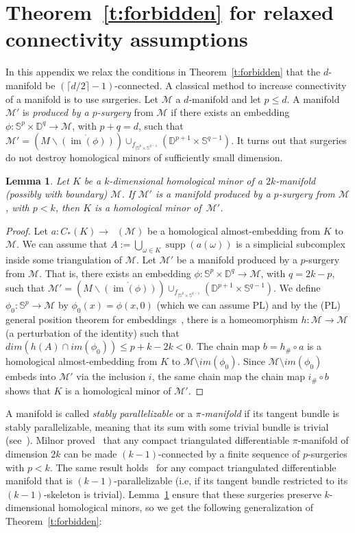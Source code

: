 \documentclass[11pt]{article}
\newcommand{\M}{\mathcal{M}}
\DeclareMathOperator{\supp}{supp}
\DeclareMathOperator{\Csing}{C_*^{sing}}
\DeclareMathOperator{\im}{im}
\newcommand{\defn}[1]{\emph{\color{violet}#1}}
\newcommand{\pth}[1]{\left(#1\right)}
\newtheorem{lemma}{Lemma}[section]
\begin{document}
\section{Theorem~\ref{t:forbidden} for relaxed connectivity assumptions}\label{app:relax}
%
In this appendix we relax the conditions in Theorem~\ref{t:forbidden} that the $d$-manifold be $(\lceil d/2 \rceil -1)$-connected. 
%
\medskip
%
A classical method to increase connectivity of a manifold is to use surgeries. Let $\M$ a $d$-manifold and let $p \le d$. A manifold~$\M'$ is \defn{produced by a $p$-surgery} from $\M$ if there exists an embedding $\phi:\mathbb{S}^p\times \mathbb{D}^{q}\to \M$, with $p+q=d$, such that $\M'= \pth{M\backslash \mathring{\pth{\im(\phi)}}}\cup_{f_{|\mathbb{S}^p\times\mathbb{S}^{q-1}}}\pth{\mathbb{D}^{p+1}\times\mathbb{S}^{q-1}}$. It turns out that surgeries do not destroy homological minors of sufficiently small dimension.
%
\begin{lemma}\label{l:surgery-stability-minors}
  Let $K$ be a $k$-dimensional homological minor of a $2k$-manifold (possibly with boundary) $\M$. If $\M'$ is a manifold produced by a $p$-surgery from $\M$,
  with $p < k$, then $K$ is a homological minor of~$\M'$.
\end{lemma}
\begin{proof}
  Let $a:C_*(K)\to \Csing(\M)$ be a homological almost-embedding from $K$ to $\M$. We can assume that $A:=\bigcup_{\omega\in K}\supp(a(\omega))$ is a simplicial subcomplex inside some triangulation of $\M$. Let $\M'$ be a manifold produced by a $p$-surgery from $\M$. That is, there exists an embedding $\phi:\mathbb{S}^p\times\mathbb{D}^q\to \M$, with  $q = 2k-p$, such that $\M'= \pth{M\backslash \mathring{\pth{\im(\phi)}}}\cup_{f_{|\mathbb{S}^p\times\mathbb{S}^{q-1}}}\pth{\mathbb{D}^{p+1}\times\mathbb{S}^{q-1}}$. We define $\phi_0:\mathbb{S}^p\to\M$ by $\phi_0(x)=\phi(x,0)$ (which we can assume PL) and by the (PL) general position theorem for embeddings~\cite[$\S$5.3]{Rourke1972IntroductionTP}, there is a homeomorphism $h:\M\to\M$ (a perturbation of the identity) such that $dim\pth{h( A)\cap im(\phi_0)}\leq p+k-2k<0$. The chain map $b=h_{\#}\circ a$ is a homological almost-embedding from $K$ to $\M\setminus im(\phi_0)$. Since $\M\setminus im(\phi_0)$ embeds into $\M'$ via the inclusion $i$, the same chain map the chain map $i_\#\circ b$ shows that $K$ is a homological minor of $\M'$.
\end{proof}
%
A manifold is called \emph{stably parallelizable} or a \emph{$\pi$-manifold} if its tangent bundle is stably parallelizable, meaning that its sum with some trivial bundle is trivial (see~\cite{milnor}). Milnor proved~\cite[Corollary to Theorem~$2$]{milnor} that any compact triangulated differentiable $\pi$-manifold of dimension $2k$ can be made $(k-1)$-connected by a finite sequence of $p$-surgeries with $p<k$. The same result holds~\cite[Corollary to Theorem~$3$]{milnor} for any compact triangulated differentiable manifold that is $(k-1)$-parallelizable (i.e, if its tangent bundle restricted to its $(k-1)$-skeleton is trivial). Lemma~\ref{l:surgery-stability-minors} ensure that these surgeries preserve $k$-dimensional homological minors, so we get the following generalization of Theorem~\ref{t:forbidden}:
\end{document}
